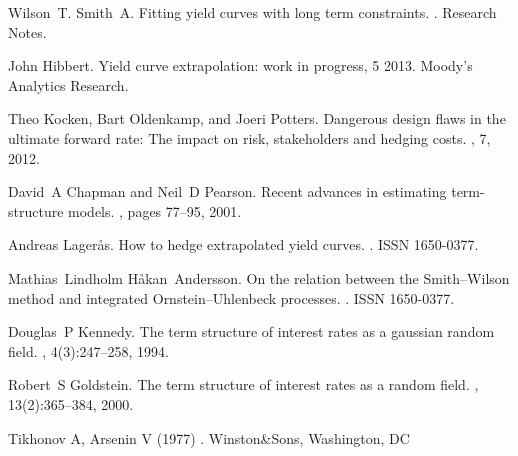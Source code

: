\documentclass[a4paper]{iccf2017}
\begin{document}
\begin{thebibliography}{99}
Wilson~T. Smith~A.
\newblock Fitting yield curves with long term constraints.
.
\newblock Research Notes.

John Hibbert.
\newblock Yield curve extrapolation: work in progress, 5 2013.
\newblock Moody's Analytics Research.

Theo Kocken, Bart Oldenkamp, and Joeri Potters.
\newblock Dangerous design flaws in the ultimate forward rate: The impact on
risk, stakeholders and hedging costs.
, 7, 2012.

David~A Chapman and Neil~D Pearson.
\newblock Recent advances in estimating term-structure models.
, pages 77--95, 2001.

Andreas Lager\r{a}s.
\newblock How to hedge extrapolated yield curves.
.
\newblock ISSN 1650-0377.

Mathias~Lindholm H\r{a}kan~Andersson.
\newblock On the relation between the {S}mith--{W}ilson method and integrated
{O}rnstein--{U}hlenbeck processes.
.
\newblock ISSN 1650-0377.

Douglas~P Kennedy.
\newblock The term structure of interest rates as a gaussian random field.
, 4(3):247--258, 1994.

Robert~S Goldstein.
\newblock The term structure of interest rates as a random field.
, 13(2):365--384, 2000.

Tikhonov A, Arsenin V (1977)
.
\newblock Winston\&Sons, Washington, DC
\end{thebibliography}
\end{document}
